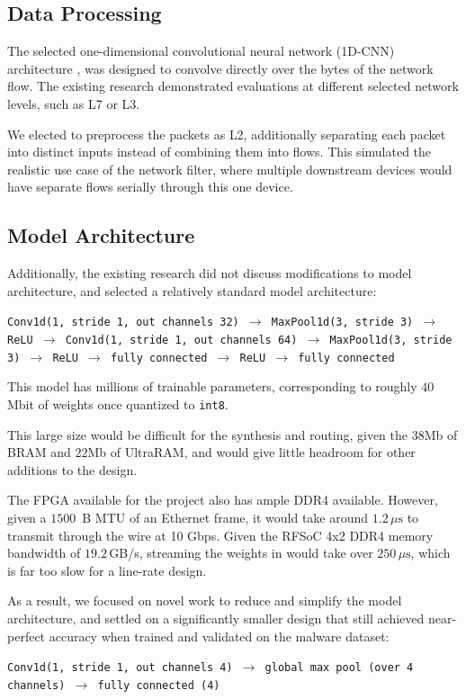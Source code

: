 \documentclass[conference]{IEEEtran}
\begin{document}
\subsection{Data Processing}
The selected one-dimensional convolutional neural network (1D-CNN)
architecture \cite{paper-wang-conv1d},
was designed to convolve directly over the bytes of the network flow.
The existing research demonstrated evaluations at different selected
network levels, such as L7 or L3.

We elected to preprocess the packets as L2,
additionally separating each packet into distinct inputs
instead of combining them into flows.
This simulated the realistic use case of the network filter,
where multiple downstream devices would have separate
flows serially through this one device.

\subsection{Model Architecture}
Additionally, the existing research did not discuss modifications
to model architecture, and selected a relatively standard model architecture:
\begin{center}
    \texttt{Conv1d(1, stride 1, out channels 32)
        $\rightarrow$ MaxPool1d(3, stride 3)
        $\rightarrow$ ReLU
        $\rightarrow$ Conv1d(1, stride 1, out channels 64)
        $\rightarrow$ MaxPool1d(3, stride 3)
        $\rightarrow$ ReLU
        $\rightarrow$ fully connected
        $\rightarrow$ ReLU
        $\rightarrow$ fully connected}
\end{center}

This model has millions of trainable parameters,
corresponding to roughly $40$\,Mbit of weights once quantized to \texttt{int8}.

This large size would be difficult for the synthesis and routing,
given the $38$Mb of BRAM and $22$Mb of UltraRAM,
and would give little headroom for other additions to the design.

The FPGA available for the project also has ample DDR4 available.
However, given a $1500$~B MTU of an Ethernet frame,
it would take around $1.2\,\mu\text{s}$ to transmit through the wire at 10 Gbps.
Given the RFSoC 4x2 DDR4 memory bandwidth of $19.2$\,GB/s,
streaming the weights in would take over $250\,\mu\text{s}$,
which is far too slow for a line-rate design.

As a result, we focused on novel work to reduce and simplify the model
architecture, and settled on a significantly smaller design
that still achieved near-perfect accuracy when trained and validated
on the malware dataset:
\begin{center}
    \texttt{Conv1d(1, stride 1, out channels 4)
        $\rightarrow$ global max pool (over 4 channels)
        $\rightarrow$ fully connected (4)}
\end{center}
\end{document}
